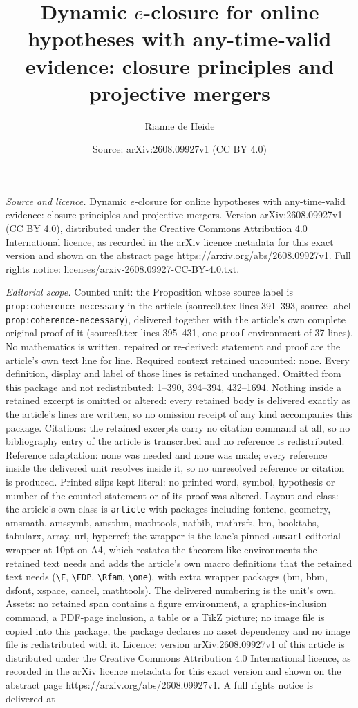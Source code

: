 \documentclass[10pt,a4paper]{amsart}
\title[Dynamic $e$-closure for online hypotheses with any-time-vali]{Dynamic $e$-closure for online hypotheses with any-time-valid evidence: closure principles and projective mergers}
\author{Rianne de Heide}
\date{Source: arXiv:2608.09927v1 (CC BY 4.0)}
\begin{document}
\maketitle

\noindent\emph{Source and licence.} Dynamic $e$-closure for online hypotheses with any-time-valid evidence: closure principles and projective mergers. Version arXiv:2608.09927v1 (CC BY 4.0), distributed under the Creative Commons Attribution 4.0 International licence, as recorded in the arXiv licence metadata for this exact version and shown on the abstract page https://arxiv.org/abs/2608.09927v1. Full rights notice: licenses/arxiv-2608.09927-CC-BY-4.0.txt.\par\smallskip

\noindent\textit{Editorial scope.} Counted unit: the Proposition whose source label is \texttt{prop:coherence-necessary} in the article (source0.tex lines 391--393, source label \texttt{prop:coherence-necessary}), delivered together with the article's own complete original proof of it (source0.tex lines 395--431, one \texttt{proof} environment of 37 lines). No mathematics is written, repaired or re-derived: statement and proof are the article's own text line for line. Required context retained uncounted: none. Every definition, display and label of those lines is retained unchanged. Omitted from this package and not redistributed: 1--390, 394--394, 432--1694. Nothing inside a retained excerpt is omitted or altered: every retained body is delivered exactly as the article's lines are written, so no omission receipt of any kind accompanies this package. Citations: the retained excerpts carry no citation command at all, so no bibliography entry of the article is transcribed and no reference is redistributed. Reference adaptation: none was needed and none was made; every reference inside the delivered unit resolves inside it, so no unresolved reference or citation is produced. Printed slips kept literal: no printed word, symbol, hypothesis or number of the counted statement or of its proof was altered. Layout and class: the article's own class is \texttt{article} with packages including fontenc, geometry, amsmath, amssymb, amsthm, mathtools, natbib, mathrsfs, bm, booktabs, tabularx, array, url, hyperref; the wrapper is the lane's pinned \texttt{amsart} editorial wrapper at 10pt on A4, which restates the theorem-like environments the retained text needs and adds the article's own macro definitions that the retained text needs (\texttt{\textbackslash F}, \texttt{\textbackslash FDP}, \texttt{\textbackslash Rfam}, \texttt{\textbackslash one}), with extra wrapper packages (bm, bbm, dsfont, xspace, cancel, mathtools). The delivered numbering is the unit's own. Assets: no retained span contains a figure environment, a graphics-inclusion command, a PDF-page inclusion, a table or a TikZ picture; no image file is copied into this package, the package declares no asset dependency and no image file is redistributed with it. Licence: version arXiv:2608.09927v1 of this article is distributed under the Creative Commons Attribution 4.0 International licence, as recorded in the arXiv licence metadata for this exact version and shown on the abstract page https://arxiv.org/abs/2608.09927v1. A full rights notice is delivered at 
\end{document}
